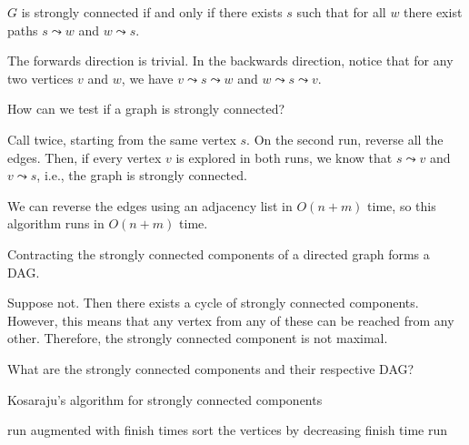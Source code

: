 \begin{corollary}
  $G$ is strongly connected if and only if there exists $s$
  such that for all $w$ there exist paths $s \leadsto w$ and $w \leadsto s$.
\end{corollary}
\begin{prf}
  The forwards direction is trivial.
  In the backwards direction, notice that for any two vertices $v$ and $w$,
  we have $v \leadsto s \leadsto w$ and $w \leadsto s \leadsto v$.
\end{prf}

\begin{problem}
  How can we test if a graph is strongly connected?
\end{problem}
\begin{sol}
  Call  twice, starting from the same vertex $s$.
  On the second run, reverse all the edges.
  Then, if every vertex $v$ is explored in both runs,
  we know that $s \leadsto v$ and $v \leadsto s$,
  i.e., the graph is strongly connected.

  We can reverse the edges using an adjacency list in $O(n+m)$ time,
  so this algorithm runs in $O(n+m)$ time.
\end{sol}

\begin{prop}
  Contracting the strongly connected components of a directed graph
  forms a DAG.
\end{prop}
\begin{prf}
  Suppose not. Then there exists a cycle of strongly connected components.
  However, this means that any vertex from any of these can be reached from any other.
  Therefore, the strongly connected component is not maximal.
\end{prf}

\begin{problem}
  What are the strongly connected components and their respective DAG?
\end{problem}
\begin{algorithm}
  \caption{Kosaraju's algorithm for strongly connected components}
  \begin{algorithmic}[1]
    \State run  augmented with finish times
    \State sort the vertices by decreasing finish time
    \State run 
    \State {}
    \EndProcedure
  \end{algorithmic}
\end{algorithm}

